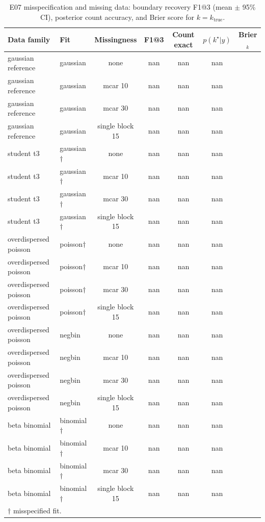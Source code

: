 \begin{table}[!htbp]
\centering
\footnotesize
\caption{E07 misspecification and missing data: boundary recovery F1@3 (mean $\pm$ 95\% CI), posterior count accuracy, and Brier score for $k=k_\mathrm{true}$.}
\label{tab:E07-robustness}
\begin{tabular}{llccccc}
\hline
Data family & Fit & Missingness & F1@3 & Count exact & $p(k^\star|y)$ & Brier$_k$ \\
\hline
gaussian reference & gaussian & none & nan & nan & nan \\
gaussian reference & gaussian & mcar 10 & nan & nan & nan \\
gaussian reference & gaussian & mcar 30 & nan & nan & nan \\
gaussian reference & gaussian & single block 15 & nan & nan & nan \\
student t3 & gaussian$\dag$ & none & nan & nan & nan \\
student t3 & gaussian$\dag$ & mcar 10 & nan & nan & nan \\
student t3 & gaussian$\dag$ & mcar 30 & nan & nan & nan \\
student t3 & gaussian$\dag$ & single block 15 & nan & nan & nan \\
overdispersed poisson & poisson$\dag$ & none & nan & nan & nan \\
overdispersed poisson & poisson$\dag$ & mcar 10 & nan & nan & nan \\
overdispersed poisson & poisson$\dag$ & mcar 30 & nan & nan & nan \\
overdispersed poisson & poisson$\dag$ & single block 15 & nan & nan & nan \\
overdispersed poisson & negbin & none & nan & nan & nan \\
overdispersed poisson & negbin & mcar 10 & nan & nan & nan \\
overdispersed poisson & negbin & mcar 30 & nan & nan & nan \\
overdispersed poisson & negbin & single block 15 & nan & nan & nan \\
beta binomial & binomial$\dag$ & none & nan & nan & nan \\
beta binomial & binomial$\dag$ & mcar 10 & nan & nan & nan \\
beta binomial & binomial$\dag$ & mcar 30 & nan & nan & nan \\
beta binomial & binomial$\dag$ & single block 15 & nan & nan & nan \\
\hline
\multicolumn{7}{l}{\small$\dag$ misspecified fit.} \\
\end{tabular}
\end{table}
